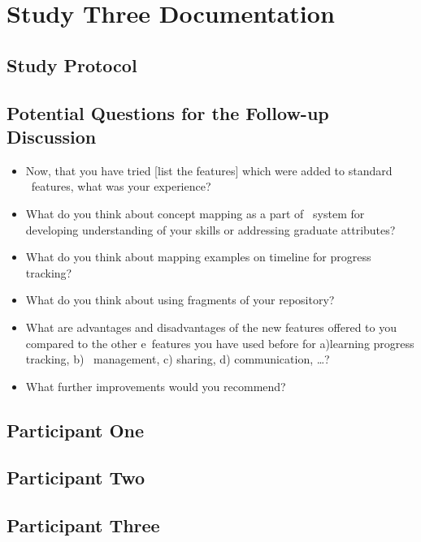 \chapter{Study Three Documentation \label{cha:app7}}

\section{Study Protocol}

\section{Potential Questions for the Follow-up Discussion}
\begin{itemize}
  \item Now, that you have tried [list the features] which were added to
  standard \ep~features, what was your experience?
  \item What do you think about concept mapping as a part of \ep~system
  for developing understanding of your skills or addressing graduate attributes?
  \item What do you think about mapping examples on timeline for progress
  tracking?
  \item What do you think about using fragments of your repository?
  \item What are advantages and disadvantages of the new features offered to you
  compared to the other e\ep~features you have used before for a)learning
  progress tracking, b) \ep~management, c) sharing, d) communication, \ldots?
  \item What further improvements would you recommend?
\end{itemize}



\section{Participant One}

\section{Participant Two}
 
\section{Participant Three}
